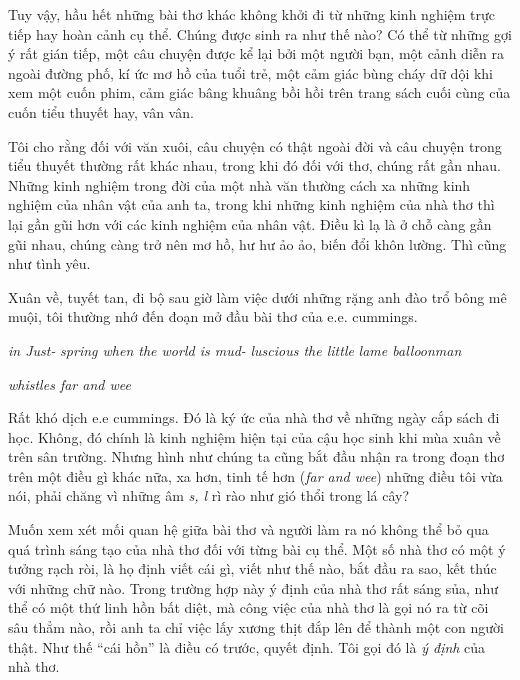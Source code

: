 \documentclass[../main.tex]{subfiles}
\begin{document}
\begin{multicols}{2}
Tuy vậy, hầu hết những bài thơ khác không khởi đi từ những kinh nghiệm trực tiếp hay hoàn cảnh cụ thể. Chúng được sinh ra như thế nào? Có thể từ những gợi ý rất gián tiếp, một câu chuyện được kể lại bởi một người bạn, một cảnh diễn ra ngoài đường phố, kí ức mơ hồ của tuổi trẻ, một cảm giác bùng cháy dữ dội khi xem một cuốn phim, cảm giác bâng khuâng bồi hồi trên trang sách cuối cùng của cuốn tiểu thuyết hay, vân vân. 

Tôi cho rằng đối với văn xuôi, câu chuyện có thật ngoài đời và câu chuyện trong tiểu thuyết thường rất khác nhau, trong khi đó đối với thơ, chúng rất gần nhau. Những kinh nghiệm trong đời của một nhà văn thường cách xa những kinh nghiệm của nhân vật của anh ta, trong khi những kinh nghiệm của nhà thơ thì lại gần gũi hơn với các kinh nghiệm của nhân vật. Điều kì lạ là ở chỗ càng gần gũi nhau, chúng càng trở nên mơ hồ, hư hư ảo ảo, biến đổi khôn lường. 
Thì cũng như tình yêu. 

Xuân về, tuyết tan, đi bộ sau giờ làm việc dưới những rặng anh đào trổ bông mê muội, tôi thường nhớ đến đoạn mở đầu bài thơ của e.e. cummings. 
\begin{blockquote}


\textit{in Just-} 
\textit{spring when the world is mud-} 
\textit{luscious the little} 
\textit{lame balloonman} 

\textit{whistles far and wee} 

\end{blockquote}


Rất khó dịch e.e cummings. Đó là ký ức của nhà thơ về những ngày cắp sách đi học. Không, đó chính là kinh nghiệm hiện tại của cậu học sinh khi mùa xuân về trên sân trường. Nhưng hình như chúng ta cũng bắt đầu nhận ra trong đoạn thơ trên một điều gì khác nữa, xa hơn, tinh tế hơn (\textit{far and wee}) những điều tôi vừa nói, phải chăng vì những âm \textit{s, l} rì rào như gió thổi trong lá cây? 

Muốn xem xét mối quan hệ giữa bài thơ và người làm ra nó không thể bỏ qua quá trình sáng tạo của nhà thơ đối với từng bài cụ thể. Một số nhà thơ có một ý tưởng rạch ròi, là họ định viết cái gì, viết như thế nào, bắt đầu ra sao, kết thúc với những chữ nào. Trong trường hợp này ý định của nhà thơ rất sáng sủa, như thể có một thứ linh hồn bất diệt, mà công việc của nhà thơ là gọi nó ra từ cõi sâu thẳm nào, rồi anh ta chỉ việc lấy xương thịt đắp lên để thành một con người thật. Như thế “cái hồn” là điều có trước, quyết định. Tôi gọi đó là \textit{ý định} của nhà thơ. 


\end{multicols}
\end{document}
